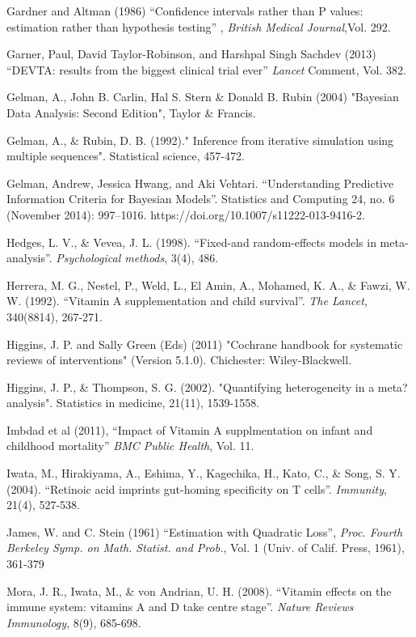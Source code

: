 \documentclass[12pt]{article}
\begin{document}
\begin{thebibliography}{99}
\bibitem Gardner and Altman (1986) ``Confidence intervals rather than P values: estimation rather than hypothesis testing'' , \emph{British Medical Journal},Vol. 292.

Garner, Paul, David Taylor-Robinson, and Harshpal Singh Sachdev (2013) ``DEVTA: results from the biggest clinical trial ever'' \emph{Lancet} Comment, Vol. 382.

 Gelman, A., John B. Carlin, Hal S. Stern \& Donald B. Rubin (2004) "Bayesian Data Analysis: Second Edition", Taylor \& Francis.

 Gelman, A., \& Rubin, D. B. (1992)." Inference from iterative simulation using multiple sequences". Statistical science, 457-472.

\bibitem Gelman, Andrew, Jessica Hwang, and Aki Vehtari. ``Understanding Predictive Information Criteria for Bayesian Models''. Statistics and Computing 24, no. 6 (November 2014): 997–1016. https://doi.org/10.1007/s11222-013-9416-2.

\bibitem Hedges, L. V., \& Vevea, J. L. (1998). ``Fixed-and random-effects models in meta-analysis''. \emph{Psychological methods}, 3(4), 486.

\bibitem Herrera, M. G., Nestel, P., Weld, L., El Amin, A., Mohamed, K. A., \& Fawzi, W. W. (1992). ``Vitamin A supplementation and child survival''. \emph{The Lancet}, 340(8814), 267-271.

 Higgins, J. P. and Sally Green (Eds) (2011) "Cochrane handbook for systematic reviews of interventions" (Version 5.1.0). Chichester: Wiley-Blackwell.

 Higgins, J. P., \& Thompson, S. G. (2002). "Quantifying heterogeneity in a meta?analysis". Statistics in medicine, 21(11), 1539-1558.

\bibitem Imbdad et al (2011), ``Impact of Vitamin A supplmentation on infant and childhood mortality'' \emph{BMC Public Health}, Vol. 11.

\bibitem Iwata, M., Hirakiyama, A., Eshima, Y., Kagechika, H., Kato, C., \& Song, S. Y. (2004). ``Retinoic acid imprints gut-homing specificity on T cells''. \emph{Immunity}, 21(4), 527-538.

\bibitem James, W. and C. Stein (1961) ``Estimation with Quadratic Loss'', \emph{Proc. Fourth Berkeley Symp. on Math. Statist. and Prob.}, Vol. 1 (Univ. of Calif. Press, 1961), 361-379

\bibitem Mora, J. R., Iwata, M., \& von Andrian, U. H. (2008). ``Vitamin effects on the immune system: vitamins A and D take centre stage''. \emph{Nature Reviews Immunology}, 8(9), 685-698.


\end{thebibliography}
\end{document}
